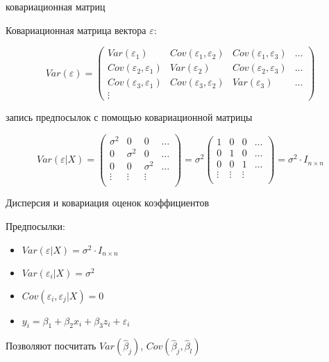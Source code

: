 \documentclass[ignorenonframetext,]{beamer}
\begin{document}
\begin{frame}{ковариационная матриц}

Ковариационная матрица вектора $\varepsilon$:

\[
Var(\varepsilon)=\begin{pmatrix}
Var(\varepsilon_1) & Cov(\varepsilon_1,\varepsilon_2) & Cov(\varepsilon_1,\varepsilon_3) & \ldots \\
Cov(\varepsilon_2,\varepsilon_1) & Var(\varepsilon_2) &  Cov(\varepsilon_2,\varepsilon_3) & \ldots \\
Cov(\varepsilon_3,\varepsilon_1) & Cov(\varepsilon_3,\varepsilon_2) & Var(\varepsilon_3) &   \ldots \\
\vdots & & 
\end{pmatrix}
\]

\end{frame}

\begin{frame}{запись предпосылок с помощью ковариационной матрицы}

\[
Var(\varepsilon|X) = \begin{pmatrix}
\sigma^2 & 0 & 0 & \ldots \\
0 & \sigma^2 & 0 & \ldots \\
0 & 0 & \sigma^2 & \ldots \\
\vdots & \vdots &\vdots  & \\
\end{pmatrix}
= \sigma^2 \begin{pmatrix}
1 & 0 & 0 & \ldots \\
0 & 1 & 0 & \ldots \\
0 & 0 & 1 & \ldots \\
\vdots & \vdots &  \vdots & \\
\end{pmatrix}=\sigma^2 \cdot I_{n\times n}
\]

\end{frame}

\begin{frame}{Дисперсия и ковариация оценок коэффициентов}

Предпосылки:

\begin{itemize}
\itemsep1pt\parskip0pt
\item
  $Var(\varepsilon|X)=\sigma^2 \cdot I_{n\times n}$
\item
  $Var(\varepsilon_i|X)=\sigma^2$
\item
  $Cov(\varepsilon_i,\varepsilon_j|X)=0$
\item
  $y_i=\beta_1 + \beta_2 x_i + \beta_3 z_i +\varepsilon_i$
\end{itemize}

Позволяют посчитать $Var(\hat{\beta}_j)$,
$Cov(\hat{\beta}_j,\hat{\beta}_l)$

\end{frame}
\end{document}
